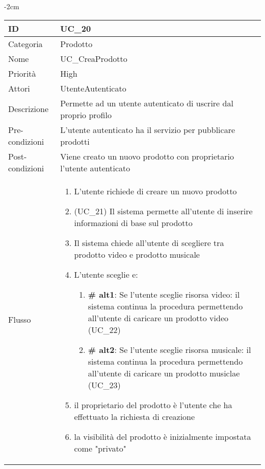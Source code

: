\begin{center}
\begin{table}[bp]
    \centering
    \addtolength{\leftskip} {-2cm}
\begin{tabular}{ |p{2.6cm}|p{13cm}|  }
\hline
ID & UC\_20\\\hline
Categoria & Prodotto \\\hline
Nome & UC\_CreaProdotto \\\hline
Priorità & High \\\hline
Attori &  UtenteAutenticato \\\hline
Descrizione & Permette ad un utente autenticato di uscrire dal proprio profilo \\\hline
Pre-condizioni &  L'utente autenticato ha il servizio per pubblicare prodotti\\\hline
Post-condizioni &  Viene creato un nuovo prodotto con proprietario l'utente autenticato\\\hline
Flusso &  	\vspace{-5mm} \begin{enumerate}
			\item L'utente richiede di creare un nuovo prodotto
			\item (UC\_21) Il sistema permette all'utente di inserire informazioni di base sul prodotto
			\item Il sistema chiede all'utente di scegliere tra prodotto video e prodotto musicale
			\item L'utente sceglie e:
			\begin{enumerate}[  ]
				\item \textbf{\# alt1}: Se l'utente sceglie risorsa video: il sistema continua la procedura permettendo all'utente di caricare un prodotto video (UC\_22)
				\item \textbf{\# alt2}: Se l'utente sceglie risorsa musicale: il sistema continua la procedura permettendo all'utente di caricare un prodotto musiclae (UC\_23)
			\end{enumerate}
			\item il proprietario del prodotto è l'utente che ha effettuato la richiesta di creazione
			\item la visibilità del prodotto è inizialmente impostata come "privato"
		\end{enumerate}\\\hline
\end{tabular}
\label{table_use_case:20}\newline
\end{table}


\end{center}
